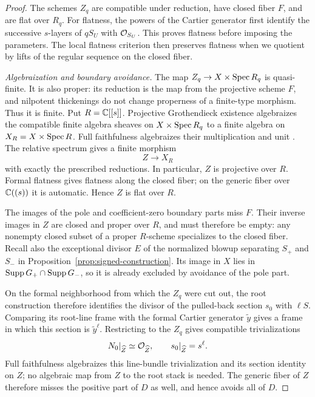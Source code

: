\begin{proof}
The schemes $Z_q$ are compatible under reduction, have
closed fiber $F$, and are flat over $R_q$.  For flatness,
the powers of the Cartier generator first identify the
successive $s$-layers of $qS_U$ with $\mathcal{O}_{S_U}$.  This
proves flatness before imposing the parameters.  The local
flatness criterion then preserves flatness when we quotient
by lifts of the regular sequence on the closed fiber.

\smallskip\noindent\emph{Algebraization and boundary avoidance.}
The map $Z_q\to X\times\operatorname{Spec} R_q$ is quasi-finite.  It is
also proper: its reduction is the map from the projective
scheme $F$, and nilpotent thickenings do not change
properness of a finite-type morphism.  Thus it is finite.
Put $R=\mathbb{C}[[s]]$.  Projective Grothendieck existence
algebraizes the compatible finite algebra sheaves on
$X\times\operatorname{Spec} R_q$ to a finite algebra on
$X_R=X\times\operatorname{Spec} R$.  Full faithfulness algebraizes
their multiplication and unit
\cite[Lemmas~30.24.1 and~30.24.3]{StacksExistence}.
The relative spectrum gives a finite morphism
\[
 Z\longrightarrow X_R
\]
with exactly the prescribed reductions.  In particular,
$Z$ is projective over $R$.  Formal flatness gives
flatness along the closed fiber; on the generic fiber
over $\mathbb{C}((s))$ it is automatic.  Hence $Z$ is flat over $R$.

The images of the pole and coefficient-zero boundary parts
miss $F$.  Their inverse images in $Z$ are closed and
proper over $R$, and must therefore be empty: any nonempty
closed subset of a proper $R$-scheme specializes to the
closed fiber.  Recall also the exceptional divisor $E$ of the
normalized blowup separating $S_+$ and $S_-$ in
Proposition~\ref{prop:signed-construction}.  Its image in $X$
lies in $\operatorname{Supp} G_+\cap\operatorname{Supp} G_-$, so it is already excluded
by avoidance of the pole part.

On the formal neighborhood from which the $Z_q$ were cut out,
the root construction therefore identifies the divisor of the
pulled-back section $s_0$ with $\ell S$.  Comparing its
root-line frame with the formal Cartier generator
$\widetilde y$ gives a frame in which this section is
$\widetilde y^\ell$.  Restricting to the $Z_q$ gives
compatible trivializations
\[
 N_0|_{\widehat Z}\simeq\mathcal{O}_{\widehat Z},
 \qquad s_0|_{\widehat Z}=s^\ell.
\]
Full faithfulness algebraizes this line-bundle trivialization
and its section identity on $Z$; no algebraic map from $Z$
to the root stack is needed.  The generic fiber of $Z$ therefore misses
the positive part of $D$ as well, and hence avoids all of
$D$.


\end{proof}

